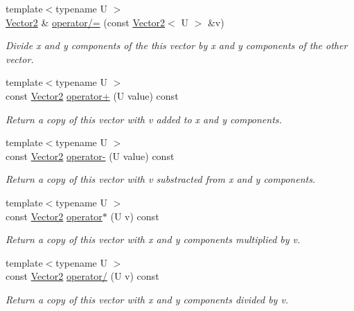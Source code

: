 \begin{DoxyCompactItemize}
{\footnotesize template$<$typename U $>$ }\\\hyperlink{classfuzzy_telegram_1_1_vector2}{Vector2} \& \hyperlink{classfuzzy_telegram_1_1_vector2_ac90357fe51da2902de2961ff47f68c3c}{operator/=} (const \hyperlink{classfuzzy_telegram_1_1_vector2}{Vector2}$<$ U $>$ \&v)
\begin{DoxyCompactList}\small\item\em Divide x and y components of the this vector by x and y components of the other vector. \end{DoxyCompactList}\item 
{\footnotesize template$<$typename U $>$ }\\const \hyperlink{classfuzzy_telegram_1_1_vector2}{Vector2} \hyperlink{classfuzzy_telegram_1_1_vector2_ae2efd0ca55306f96980fbe17335ea54a}{operator+} (U value) const 
\begin{DoxyCompactList}\small\item\em Return a copy of this vector with v added to x and y components. \end{DoxyCompactList}\item 
{\footnotesize template$<$typename U $>$ }\\const \hyperlink{classfuzzy_telegram_1_1_vector2}{Vector2} \hyperlink{classfuzzy_telegram_1_1_vector2_ae1bd17b071382d3d0a8fece1e0590c5d}{operator-\/} (U value) const 
\begin{DoxyCompactList}\small\item\em Return a copy of this vector with v substracted from x and y components. \end{DoxyCompactList}\item 
{\footnotesize template$<$typename U $>$ }\\const \hyperlink{classfuzzy_telegram_1_1_vector2}{Vector2} \hyperlink{classfuzzy_telegram_1_1_vector2_a9cf245fd13bb370ce4036a4ea5fd3636}{operator$\ast$} (U v) const 
\begin{DoxyCompactList}\small\item\em Return a copy of this vector with x and y components multiplied by v. \end{DoxyCompactList}\item 
{\footnotesize template$<$typename U $>$ }\\const \hyperlink{classfuzzy_telegram_1_1_vector2}{Vector2} \hyperlink{classfuzzy_telegram_1_1_vector2_a37614437335d60eb4aa508eabf4ffca3}{operator/} (U v) const 
\begin{DoxyCompactList}\small\item\em Return a copy of this vector with x and y components divided by v. \end{DoxyCompactList}\item 

\end{DoxyCompactItemize}
